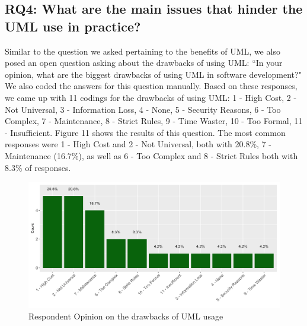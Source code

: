 \documentclass[letterpaper, 10 pt, conference]{ieeeconf}  %
\begin{document}
   
\subsection{RQ4: What are the main issues that hinder the UML use in practice?}

Similar to the question we asked pertaining to the benefits of UML, we also posed an open question asking about the drawbacks of using UML: ``In your opinion, what are the biggest drawbacks of using UML in software development?" We also coded the answers for this question manually. Based on these responses, we came up with 11  codings for the drawbacks of using UML: 1 - High Cost, 2 - Not Universal, 3 - Information Loss, 4 - None, 5 - Security Reasons, 6 - Too Complex, 7 - Maintenance, 8 - Strict Rules, 9 - Time Waster, 10 - Too Formal, 11 - Insufficient. Figure 11 shows the results of this question. The most common responses were 1 - High Cost and 2 - Not Universal, both with 20.8\%, 7 - Maintenance (16.7\%), as well as 6 - Too Complex and 8 - Strict Rules  both with 8.3\% of responses.

	  \begin{figure}[!htb]
      \centering
      \label{RQ4Concl}
   \end{figure}
   
\begin{figure}[!htb]
      \centering
      \includegraphics[scale=0.25]{Plots/DrawbacksPlot}
      \caption{Respondent Opinion on the drawbacks of UML usage}
      \label{DrawbUML}
   \end{figure}
\end{document}

